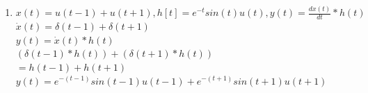 \documentclass[10pt,a4paper, margin=1in]{article}
\begin{document}
\begin{enumerate}
\begin{enumerate}
    $y[n] = x[n] * h[n] = \sum_{k=-\infty}^{\infty}x[k]h[n-k]$ \\

    $= \sum_{k=-\infty}^{\infty}2\delta[k]\delta[n-k-1] + \sum_{k=-\infty}^{\infty}\delta[k + 1]\delta[n-k-1] + \sum_{k=-\infty}^{\infty}2\delta[k]2\delta[n-k+1] + \sum_{k=-\infty}^{\infty}\delta[k + 1]\delta[n-k+1]$ \\

    $y[n] = 2\delta[n - 1] + \delta[n] + 4\delta[n+1] + 2\delta[n+2]$ \\

    \begin{filecontents}{data2a.dat}
        n   xn
        -3   0
        -2   2
        -1   4
        0    1
        1    2
        2    0
       \end{filecontents}

    
    \item %
    $x(t) = u(t-1) + u(t+1), h[t] = e^{-t}sin(t)u(t), y(t) = \frac{dx(t)}{dt}*h(t)$\\

    $\dot{x}(t) = \delta(t-1)+\delta(t+1)$ \\

    $y(t) = \dot{x}(t) * h(t)$ \\

    $(\delta(t-1)*h(t)) + (\delta(t+1)*h(t))$ \\

    $=h(t - 1) + h(t + 1)$ \\

    $y(t) = e^{-(t-1)}sin(t-1)u(t-1) + e^{-(t+1)} sin(t+1)u(t+1)$
    \end{enumerate}


\end{enumerate}
\end{document}
